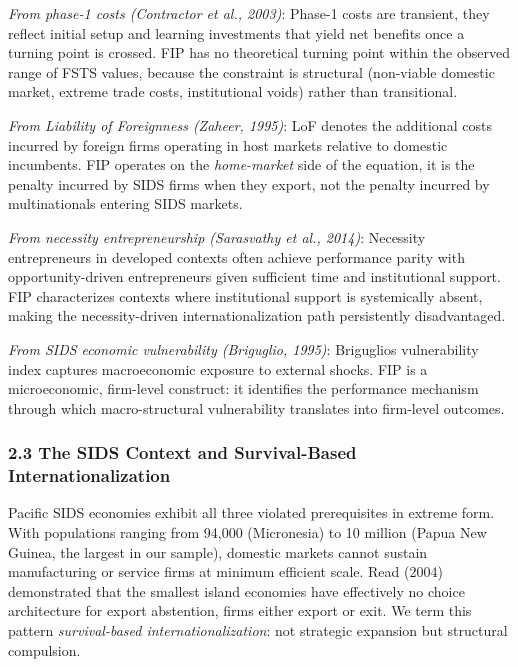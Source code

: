 \documentclass[12pt,a4paper]{article}
\begin{document}
\emph{From phase-1 costs (Contractor et al., 2003)}: Phase-1 costs are
transient, they reflect initial setup and learning investments that
yield net benefits once a turning point is crossed. FIP has no
theoretical turning point within the observed range of FSTS values,
because the constraint is structural (non-viable domestic market,
extreme trade costs, institutional voids) rather than transitional.

\emph{From Liability of Foreignness (Zaheer, 1995)}: LoF denotes the
additional costs incurred by foreign firms operating in host markets
relative to domestic incumbents. FIP operates on the \emph{home-market}
side of the equation, it is the penalty incurred by SIDS firms when they
export, not the penalty incurred by multinationals entering SIDS
markets.

\emph{From necessity entrepreneurship (Sarasvathy et al., 2014)}:
Necessity entrepreneurs in developed contexts often achieve performance
parity with opportunity-driven entrepreneurs given sufficient time and
institutional support. FIP characterizes contexts where institutional
support is systemically absent, making the necessity-driven
internationalization path persistently disadvantaged.

\emph{From SIDS economic vulnerability (Briguglio, 1995)}:
Briguglio\textquotesingle s vulnerability index captures macroeconomic
exposure to external shocks. FIP is a microeconomic, firm-level
construct: it identifies the performance mechanism through which
macro-structural vulnerability translates into firm-level outcomes.

\hypertarget{23-the-sids-context-and-survival-based-internationalization}{%
\subsubsection{2.3 The SIDS Context and Survival-Based
Internationalization}\label{23-the-sids-context-and-survival-based-internationalization}}

Pacific SIDS economies exhibit all three violated prerequisites in
extreme form. With populations ranging from 94,000 (Micronesia) to 10
million (Papua New Guinea, the largest in our sample), domestic markets
cannot sustain manufacturing or service firms at minimum efficient
scale. Read (2004) demonstrated that the smallest island economies have
effectively no choice architecture for export abstention, firms either
export or exit. We term this pattern \emph{survival-based
internationalization}: not strategic expansion but structural
compulsion.
\end{document}
